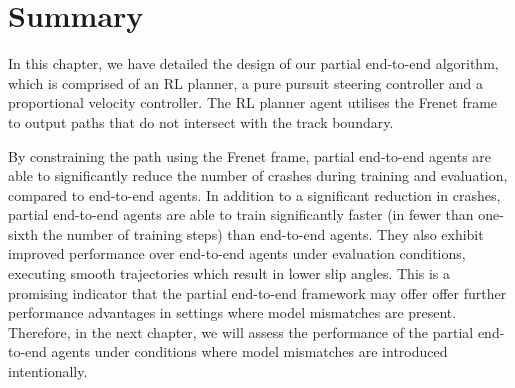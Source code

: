 \section{Summary}

In this chapter, we have detailed the design of our partial end-to-end algorithm, which is comprised of an RL planner, a pure pursuit steering controller and a proportional velocity controller.
The RL planner agent utilises the Frenet frame to output paths that do not intersect with the track boundary.

By constraining the path using the Frenet frame, partial end-to-end agents are able to significantly reduce the number of crashes during training and evaluation, compared to end-to-end agents.
In addition to a significant reduction in crashes, partial end-to-end agents are able to train significantly faster (in fewer than one-sixth the number of training steps) than end-to-end agents.
They also exhibit improved performance over end-to-end agents under evaluation conditions, executing smooth trajectories which result in lower slip angles.
This is a promising indicator that the partial end-to-end framework may offer offer further performance advantages in settings where model mismatches are present.
Therefore, in the next chapter, we will assess the performance of the partial end-to-end agents under conditions where model mismatches are introduced intentionally. 


